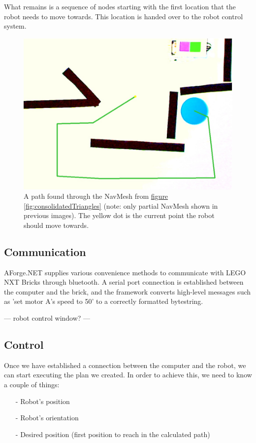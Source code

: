 \documentclass[10pt, abstracton, twocolumn]{scrartcl}
\newcommand{\fref}[1]{\hyperref[#1]{figure \vref{#1}}}
\begin{document}
What remains is a sequence of nodes starting with the first location that the robot needs to move towards. This location is handed over to the robot control system.

\begin{figure}
        \centering
        \includegraphics[width=\columnwidth]{pictures/computedPath.png}
        \caption{\small A path found through the NavMesh from \fref{fig:consolidatedTriangles} (note: only partial NavMesh shown in previous images). The yellow dot is the current point the robot should move towards.}
        \label{fig:computedPath}
\end{figure}

\subsection{Communication}
AForge.NET supplies various convenience methods to communicate with LEGO NXT Bricks through bluetooth. A serial port connection is established between the computer and the brick, and the framework converts high-level messages such as 'set motor A's speed to 50' to a correctly formatted bytestring.

--- robot control window? ---

\subsection{Control}
Once we have established a connection between the computer and the robot, we can start executing the plan we created. In order to achieve this, we need to know a couple of things:

\begin{itemize}
        \item[-] Robot's position
        \item[-] Robot's orientation
        \item[-] Desired position (first position to reach in the calculated path)
\end{itemize}
\end{document}
